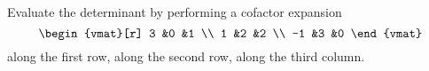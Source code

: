
\begin{Exercise}[
name={},
title={}, 
difficulty=0,
origin={\cite{JH}}]
Evaluate the determinant
by performing a cofactor expansion 
    \begin{equation*}
      \begin{vmat}[r]
         3  &0  &1  \\
         1  &2  &2  \\
        -1  &3  &0
      \end{vmat}
    \end{equation*}
\Question along the first row,
\Question along the second row,
\Question along the third column.
\end{Exercise}
